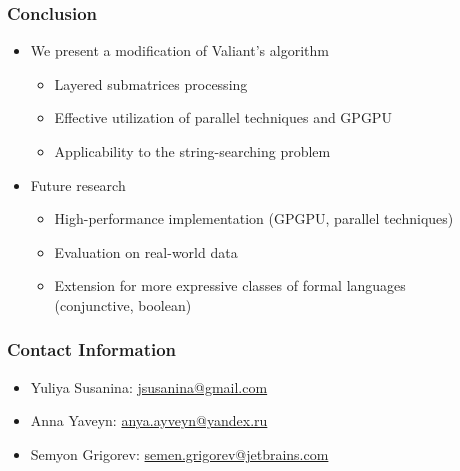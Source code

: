 \documentclass[xcolor=table]{beamer}
\begin{document}
\begin{frame}[fragile] \frametitle{Conclusion}
    \begin{itemize}
        \item We present a modification of Valiant's algorithm 
        \begin{itemize}
            \item Layered submatrices processing
            \item Effective utilization of parallel techniques and GPGPU
            \item Applicability to the string-searching problem
        \end{itemize}
        \item Future research
        \begin{itemize}
            \item High-performance implementation (GPGPU, parallel techniques)
            \item Evaluation on real-world data
            \item Extension for more expressive classes of formal languages \\ (conjunctive,  boolean)
        \end{itemize}
    \end{itemize}
\end{frame}


\begin{frame}
\frametitle{Contact Information}
\begin{itemize}
  \item Yuliya Susanina: \href{mailto:jsusanina@gmail.com}{jsusanina@gmail.com}
  \item Anna Yaveyn: \href{mailto:anya.ayveyn@yandex.ru}{anya.ayveyn@yandex.ru}
  \item Semyon Grigorev: \href{mailto:semen.grigorev@jetbrains.com}{semen.grigorev@jetbrains.com}
\end{itemize}
\vspace{0.1cm}
\end{frame}
\end{document}
